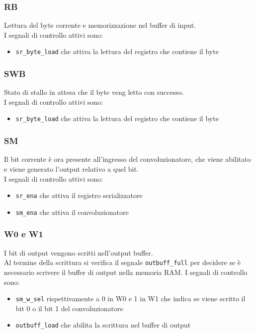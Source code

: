 \documentclass[12pt, a4paper]{article}
\begin{document}
\subsubsection{RB}
Lettura del byte corrente e memorizzazione nel buffer di input.\\
I segnali di controllo attivi sono:
\begin{itemize}
    \item \texttt{sr\_byte\_load} che attiva la lettura del registro che contiene il byte
\end{itemize}

\subsubsection{SWB}
Stato di stallo in attesa che il byte veng letto con successo.\\
I segnali di controllo attivi sono:
\begin{itemize}
    \item \texttt{sr\_byte\_load} che attiva la lettura del registro che contiene il byte
\end{itemize}

\subsubsection{SM}
Il bit corrente è ora presente all'ingresso del convoluzionatore, che viene abilitato e viene
generato l'output relativo a quel bit.\\
I segnali di controllo attivi sono:
\begin{itemize}
    \item \texttt{sr\_ena} che attiva il registro serializzatore
    \item \texttt{sm\_ena} che attiva il convoluzionatore
\end{itemize}

\subsubsection{W0 e W1}
I bit di output vengono scritti nell'output buffer.\\
Al termine della scrittura si verifica il segnale \texttt{outbuff\_full} per decidere
se è necessario scrivere il buffer di output nella memoria RAM.
I segnali di controllo sono:
\begin{itemize}
    \item \texttt{sm\_w\_sel} rispettivamente a 0 in W0 e 1 in W1 che indica se viene 
                              scritto il bit 0 o il bit 1 del convoluzionatore
    \item \texttt{outbuff\_load} che abilita la scrittura nel buffer di output
\end{itemize}
\end{document}
